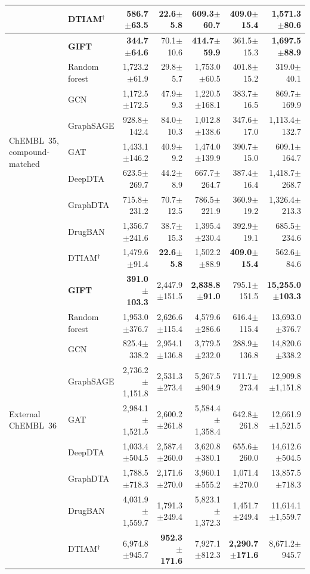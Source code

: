 \documentclass[11pt,letterpaper]{article}
\begin{document}
\begin{table}[!t]
{\begin{tabular}{l l r r r r r}
 & DTIAM$^{\dagger}$ & 586.7$\pm$63.5 & \textbf{22.6$\pm$5.8} & 609.3$\pm$60.7 & \textbf{409.0$\pm$15.4} & 1,571.3$\pm$80.6 \\
\midrule
\multirow{9}{*}{ChEMBL~35, compound-matched}
 & \textbf{GIFT} & \textbf{344.7$\pm$64.6} & 70.1$\pm$10.6 & \textbf{414.7$\pm$59.9} & 361.5$\pm$15.3 & \textbf{1,697.5$\pm$88.9} \\
 & Random forest & 1,723.2$\pm$61.9 & 29.8$\pm$5.7 & 1,753.0$\pm$60.5 & 401.8$\pm$15.2 & 319.0$\pm$40.1 \\
 & GCN & 1,172.5$\pm$172.5 & 47.9$\pm$9.3 & 1,220.5$\pm$168.1 & 383.7$\pm$16.5 & 869.7$\pm$169.9 \\
 & GraphSAGE & 928.8$\pm$142.4 & 84.0$\pm$10.3 & 1,012.8$\pm$138.6 & 347.6$\pm$17.0 & 1,113.4$\pm$132.7 \\
 & GAT & 1,433.1$\pm$146.2 & 40.9$\pm$9.2 & 1,474.0$\pm$139.9 & 390.7$\pm$15.0 & 609.1$\pm$164.7 \\
 & DeepDTA & 623.5$\pm$269.7 & 44.2$\pm$8.9 & 667.7$\pm$264.7 & 387.4$\pm$16.4 & 1,418.7$\pm$268.7 \\
 & GraphDTA & 715.8$\pm$231.2 & 70.7$\pm$12.5 & 786.5$\pm$221.9 & 360.9$\pm$19.2 & 1,326.4$\pm$213.3 \\
 & DrugBAN & 1,356.7$\pm$241.6 & 38.7$\pm$15.3 & 1,395.4$\pm$230.4 & 392.9$\pm$19.1 & 685.5$\pm$234.6 \\
 & DTIAM$^{\dagger}$ & 1,479.6$\pm$91.4 & \textbf{22.6$\pm$5.8} & 1,502.2$\pm$88.9 & \textbf{409.0$\pm$15.4} & 562.6$\pm$84.6 \\
\midrule
\multirow{9}{*}{External ChEMBL~36}
 & \textbf{GIFT} & \textbf{391.0$\pm$103.3} & 2,447.9$\pm$151.5 & \textbf{2,838.8$\pm$91.0} & 795.1$\pm$151.5 & \textbf{15,255.0$\pm$103.3} \\
 & Random forest & 1,953.0$\pm$376.7 & 2,626.6$\pm$115.4 & 4,579.6$\pm$286.6 & 616.4$\pm$115.4 & 13,693.0$\pm$376.7 \\
 & GCN & 825.4$\pm$338.2 & 2,954.1$\pm$136.8 & 3,779.5$\pm$232.0 & 288.9$\pm$136.8 & 14,820.6$\pm$338.2 \\
 & GraphSAGE & 2,736.2$\pm$1,151.8 & 2,531.3$\pm$273.4 & 5,267.5$\pm$904.9 & 711.7$\pm$273.4 & 12,909.8$\pm$1,151.8 \\
 & GAT & 2,984.1$\pm$1,521.5 & 2,600.2$\pm$261.8 & 5,584.4$\pm$1,358.4 & 642.8$\pm$261.8 & 12,661.9$\pm$1,521.5 \\
 & DeepDTA & 1,033.4$\pm$504.5 & 2,587.4$\pm$260.0 & 3,620.8$\pm$380.1 & 655.6$\pm$260.0 & 14,612.6$\pm$504.5 \\
 & GraphDTA & 1,788.5$\pm$718.3 & 2,171.6$\pm$270.0 & 3,960.1$\pm$555.2 & 1,071.4$\pm$270.0 & 13,857.5$\pm$718.3 \\
 & DrugBAN & 4,031.9$\pm$1,559.7 & 1,791.3$\pm$249.4 & 5,823.1$\pm$1,372.3 & 1,451.7$\pm$249.4 & 11,614.1$\pm$1,559.7 \\
 & DTIAM$^{\dagger}$ & 6,974.8$\pm$945.7 & \textbf{952.3$\pm$171.6} & 7,927.1$\pm$812.3 & \textbf{2,290.7$\pm$171.6} & 8,671.2$\pm$945.7 \\
\bottomrule
\end{tabular}}
\end{table}
\end{document}

